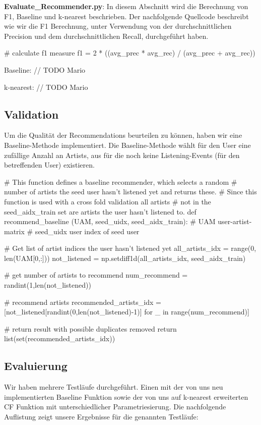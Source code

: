 \documentclass[prodmode,acmtecs]{acmsmall} %
\begin{document}
\textbf{Evaluate\_Recommender.py}: In diesem Abschnitt wird die Berechnung von F1, Baseline und k-nearest beschrieben.
Der nachfolgende Quellcode beschreibt wie wir die F1 Berechnung, unter Verwendung von der durchschnittlichen Precision und dem durchschnittlichen Recall, durchgeführt haben.

\begin{python}
	# calculate f1 measure
	f1 = 2 * ((avg_prec * avg_rec) / (avg_prec + avg_rec))
\end{python}

Baseline:
// TODO Mario

k-nearest:
// TODO Mario


\subsection{Validation}

Um die Qualität der Recommendations beurteilen zu können, haben wir eine Baseline-Methode implementiert. Die Baseline-Methode wählt für den User eine zufällige Anzahl an Artists, aus für die noch keine Listening-Events (für den betreffenden User) existieren.

\begin{python}
# This function defines a baseline recommender, which selects a random 
# number of artists the seed user hasn't listened yet and returns these. 
# Since this function is used with a cross fold validation all artists 
# not in the seed_aidx_train set are artists the user hasn't listened to.
def recommend_baseline (UAM, seed_uidx, seed_aidx_train):
    # UAM               user-artist-matrix
    # seed_uidx         user index of seed user

    # Get list of artist indices the user hasn't listened yet
    all_artists_idx = range(0, len(UAM[0,:]))
    not_listened = np.setdiff1d(all_artists_idx, seed_aidx_train)

    # get number of artists to recommend
    num_recommend = randint(1,len(not_listened))

    # recommend artists
    recommended_artists_idx = [not_listened[randint(0,len(not_listened)-1)] for _ in range(num_recommend)]

    # return result with possible duplicates removed
    return list(set(recommended_artists_idx))
\end{python}

\subsection{Evaluierung}
Wir haben mehrere Testläufe durchgeführt. Einen mit der von uns neu implementierten Baseline Funktion sowie der von uns auf k-nearest erweiterten CF Funktion mit unterschiedlicher Parametriesierung. Die nachfolgende Auflistung zeigt unsere Ergebnisse für die genannten Testläufe:
\end{document}
